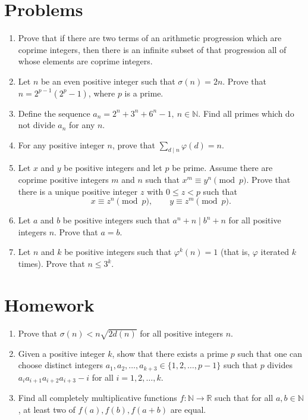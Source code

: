 \documentclass{article}
\begin{document}
\section{Problems}
\begin{enumerate}
  \item Prove that if there are two terms of an arithmetic progression which are
    coprime integers, then there is an infinite subset of that
    progression all of whose elements are coprime integers.
  \item Let $n$ be an even positive integer such that $\sigma(n)=2n$. Prove that
    $n=2^{p-1}\left(2^p-1\right)$, where $p$ is a prime.
  \item Define the sequence $a_n=2^n+3^n+6^n-1,\ n\in\mathbb N$.
    Find all primes which do not divide $a_n$ for any $n$.
  \item For any positive integer $n$, prove that $\displaystyle\sum_{d\mid
    n}\varphi(d)=n$.
  \item Let $x$ and $y$ be positive integers and let $p$ be prime. Assume there
    are coprime positive integers $m$ and $n$ such that $x^m\equiv y^n\pmod p$.
    Prove that there is a unique positive integer $z$ with $0\le z<p$ such that
    \[x\equiv z^n\pmod p,\qquad y\equiv z^m\pmod p.\]
  \item Let $a$ and $b$ be positive integers such that $a^n+n\mid b^n+n$ for all
    positive integers $n$. Prove that $a=b$.
  \item Let $n$ and $k$ be positive integers such that $\varphi^k(n)=1$ (that
    is, $\varphi$ iterated $k$ times). Prove that
    $n\le 3^k$.
\end{enumerate}
\newpage
\section{Homework}
\begin{enumerate}
  \item Prove that $\sigma(n)<n\sqrt{2d(n)}$ for all positive integers $n$.
  \item Given a positive integer $k$, show that there exists a prime $p$ such
    that one can choose distinct integers
    $a_1,a_2,\ldots,a_{k+3}\in\{1,2,\ldots,p-1\}$ such that $p$ divides
    $a_i a_{i+1}a_{i+2}a_{i+3}-i$ for all $i=1,2,\ldots,k$.
  \item Find all completely multiplicative functions $f:\mathbb N\to\mathbb R$
    such that for all $a,b\in\mathbb N$, at least two of $f(a),f(b),f(a+b)$ are
    equal.
\end{enumerate}
\end{document}
